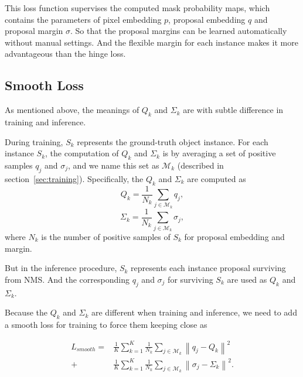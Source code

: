 \documentclass[10pt,twocolumn,letterpaper]{article}
\begin{document}
This loss function supervises the computed mask probability maps, which contains the parameters of pixel embedding $p$, proposal embedding $q$ and proposal margin $\sigma$. 
So that the proposal margins can be learned automatically without manual settings.
And the flexible margin for each instance makes it more advantageous than the hinge loss. 

\subsection{Smooth Loss}

As mentioned above, the meanings of $Q_k$ and $\Sigma_k$ are with subtle difference in training and inference.

During training, $S_k$ represents the ground-truth object instance. For each instance $S_k$, the computation of $Q_k$ and $\Sigma_k$ is by averaging a set of positive samples $q_j$ and $\sigma_j$, and we name this set as $\mathcal{M}_k$ (described in section~\ref{sec:training}).
Specifically, the $Q_k$ and $\Sigma_k$ are computed as 
\begin{equation}
   Q_k = \frac{1}{N_k}\sum_{j\in{\mathcal{M}_k}}{q_j},
   \label{eq:avg_q}
\end{equation}
\begin{equation}
   \Sigma_k = \frac{1}{N_k}\sum_{j\in{\mathcal{M}_k}}{\sigma_j},
   \label{eq:avg_sigma}
\end{equation}
where $N_k$ is the number of positive samples of $S_k$ for proposal embedding and margin. 

But in the inference procedure, $S_k$ represents each instance proposal surviving from NMS. 
And the corresponding $q_j$ and $\sigma_j$ for surviving $S_k$ are used as $Q_k$ and $\Sigma_k$.

Because the $Q_k$ and $\Sigma_k$ are different when training and inference, 
we need to add a smooth loss for training to force them keeping close as

\begin{equation}
\begin{aligned}
   L_{smooth} = &\frac{1}{K}\sum_{k=1}^{K}{
       \frac{1}{N_k}\sum_{j\in{\mathcal{M}_k}}{
          \left\|q_j-Q_k\right\|^2
       }
   }\\
   +&\frac{1}{K}\sum_{k=1}^{K}{
        \frac{1}{N_k}\sum_{j\in{\mathcal{M}_k}}{
            \left\|\sigma_j-\Sigma_k\right\|^2.
        } 
   }
   \label{eq:smooth_loss}
\end{aligned}
\end{equation}
\end{document}
